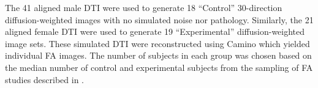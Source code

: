 \documentclass[final,5p,times,twocolumn]{elsarticle}
\newcommand{\lstsetcpp}
{
\lstset{frame = tb,
        framerule = 0.25pt,
        float,
        fontadjust,
        backgroundcolor={\color{listlightgray}},
        basicstyle = {\ttfamily\scriptsize},
        keywordstyle = {\ttfamily\color{listkeyword}\textbf},
        identifierstyle = {\ttfamily},
        commentstyle = {\ttfamily\color{listcomment}\textit},
        stringstyle = {\ttfamily},
        showstringspaces = false,
        showtabs = false,
        numbers = none,
        numbersep = 6pt,
        numberstyle={\ttfamily\color{listnumbers}},
        tabsize = 2,
        language=[ANSI]C++,
        floatplacement=!h,
        caption={\small {\ttfamily CreateDTICohort} which implements the a ground truth DTI simulator \cite{van-hecke2009}.  The short command line menu which is invoked using the  `{\ttfamily {-}h}'  option.  The long command line menu is obtained by typing `{\ttfamily {-}{-}help}'},
        captionpos=b,
        }
}
\begin{document}
The 41 aligned male DTI were used to generate 18 ``Control'' 30-direction
diffusion-weighted images
with no simulated noise nor pathology.  Similarly, the 21 aligned female
DTI were used to generate 19 ``Experimental'' diffusion-weighted image sets.
These simulated DTI were reconstructed using Camino which yielded
individual FA images.
The number of subjects in each
group was chosen based on the median number of control and experimental
subjects from the sampling of FA studies described in 
\cite{van-hecke2009}.  




%
%
\end{document}
